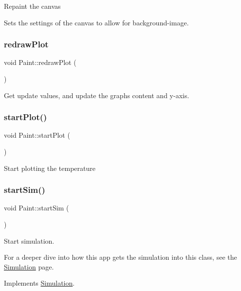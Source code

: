 Repaint the canvas

Sets the settings of the canvas to allow for background-\/image. \mbox{\label{classPaint_a9790e137dfd6386ed72aea47f176326d}} 
\subsubsection{\texorpdfstring{redrawPlot}{redrawPlot}}
{\footnotesize\ttfamily void Paint\+::redraw\+Plot (\begin{DoxyParamCaption}{ }\end{DoxyParamCaption})\hspace{0.3cm}{\ttfamily [slot]}}

Get update values, and update the graph\textquotesingle{}s content and y-\/axis. \mbox{\label{classPaint_ab8c4d8cbf3999cd2b80b299587ec9e83}} 
\subsubsection{\texorpdfstring{startPlot()}{startPlot()}}
{\footnotesize\ttfamily void Paint\+::start\+Plot (\begin{DoxyParamCaption}{ }\end{DoxyParamCaption})}

Start plotting the temperature \mbox{\label{classPaint_a1f01fcd27e595cc9aacd1ef94e3e1454}} 
\subsubsection{\texorpdfstring{startSim()}{startSim()}}
{\footnotesize\ttfamily void Paint\+::start\+Sim (\begin{DoxyParamCaption}{ }\end{DoxyParamCaption})\hspace{0.3cm}{\ttfamily [virtual]}}

Start simulation.

For a deeper dive into how this app gets the simulation into this class, see the \mbox{\hyperlink{classSimulation}{Simulation}} page. 

Implements \mbox{\hyperlink{classSimulation_ac523544ffc2b4cffed1d2a6ead5809b1}{Simulation}}.




